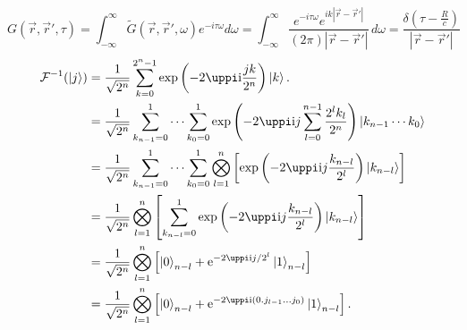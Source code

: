 \documentclass{article}
\def\ee{\mathrm{e}}
\def\ii{\mathrm{i}}
\begin{document}
\[G(\vec{r},{\vec{r}}',\tau )=\int _{-\infty }^{\infty }\tilde{G}(\vec{r},{\vec{r}}',\omega )e^{-i \tau  \omega }d\omega=\int_{-\infty }^{\infty } \frac{e^{-i \tau  \omega } e^{i k |\vec{r}-{\vec{r}}'| }}{(2 \pi ) |\vec{r}-{\vec{r}}'| } \, d\omega=\frac{\delta  \left(\tau -\frac{R}{c}\right)}{|\vec{r}-{\vec{r}}'| }\]
\[
\begin{split}	
\mathcal{F}^{-1}(\ket{j})
&{}=\frac{1}{\sqrt{2^n}}\sum_{k=0}^{2^n-1}\exp\left(-2\uppi \ii \frac{jk}{2^n}\right)\ket{k}.\\
&{}=\frac{1}{\sqrt{2^n}}\sum_{k_{n-1}=0}^1\cdots\sum_{k_{0}=0}^1\exp\left(-2\uppi \ii j\sum_{l=0}^{n-1}\frac{2^l k_l}{2^n}\right)\ket{k_{n-1}\cdots k_0}\\
&{}=\frac{1}{\sqrt{2^n}}\sum_{k_{n-1}=0}^1\cdots\sum_{k_{0}=0}^1\bigotimes_{l=1}^n\left[\exp\left(-2\uppi \ii j\frac{k_{n-l}}{2^l}\right)\ket{k_{n-l}}\right]\\
&{}=\frac{1}{\sqrt{2^n}}\bigotimes_{l=1}^n\left[\sum_{k_{n-l}=0}^1\exp\left(-2\uppi \ii j\frac{k_{n-l}}{2^l}\right)\ket{k_{n-l}}\right]\\
&{}=\frac{1}{\sqrt{2^n}}\bigotimes_{l=1}^n\left[\ket{0}_{n-l}+\ee^{-2\uppi \ii j /2^l}\ket{1}_{n-l}\right]\\
&{}=\frac{1}{\sqrt{2^n}}\bigotimes_{l=1}^n\left[\ket{0}_{n-l}+\ee^{-2\uppi \ii ({0.j_{l-1}\ldots j_0})}\ket{1}_{n-l}\right].
\end{split}
\]
\end{document}
